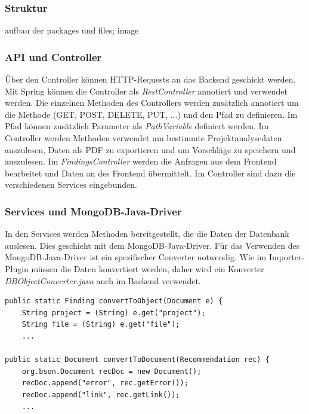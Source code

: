 \subsubsection{Struktur}
aufbau der packages und files; image
\subsubsection{API und Controller}
Über den Controller können HTTP-Requests an das Backend geschickt werden. Mit Spring können die Controller als \textit{RestController} annotiert und verwendet werden. Die einzelnen Methoden des Controllers werden zusätzlich annotiert um die Methode (GET, POST, DELETE, PUT, ...) und den Pfad zu definieren. Im Pfad können zusätzlich Parameter als \textit{PathVariable} definiert werden. Im Controller werden  Methoden verwendet um bestimmte Projektanalysedaten auszulesen, Daten als PDF zu exportieren und um Vorschläge zu speichern und auszulesen. Im \textit{FindingsController} werden die Anfragen aus dem Frontend bearbeitet und Daten an des Frontend übermittelt. Im Controller sind dazu die verschiedenen Services eingebunden.
\subsubsection{Services und MongoDB-Java-Driver}
In den Services werden Methoden bereitgestellt, die die Daten der Datenbank auslesen. Dies geschieht mit dem MongoDB-Java-Driver. Für das Verwenden des MongoDB-Java-Driver ist ein spezifischer Converter notwendig. Wie im Importer-Plugin müssen die Daten konvertiert werden, daher wird ein Konverter \textit{DBObjectConverter.java} auch im Backend verwendet.
\lstset{
  caption={Um die Datenbank benutzen können, müssen die Java-Objekte bzw. die Datenbank-JSON-Objekte konvertiert werden.}, 
  basicstyle=\small\ttfamily, 
  label=lst:main, 
  language=Java,
  frame=single,
  breaklines=true, %
  postbreak=\mbox{\textcolor{red}{$\hookrightarrow$}\space},
}

\begin{samepage}%
	\begin{lstlisting}[float=tbhp]
public static Finding convertToObject(Document e) {
    String project = (String) e.get("project");
    String file = (String) e.get("file");    
    ...

public static Document convertToDocument(Recommendation rec) {
    org.bson.Document recDoc = new Document();
    recDoc.append("error", rec.getError());
    recDoc.append("link", rec.getLink());
    ...
	\end{lstlisting}
\end{samepage}

